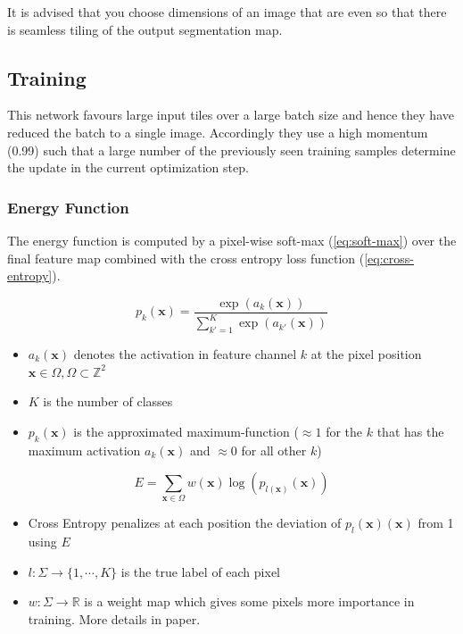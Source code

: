\documentclass[11pt]{article}
\begin{document}
It is advised that you choose dimensions of an image that are even so that there is seamless tiling of the output segmentation map.

\subsection{Training}

This network favours large input tiles over a large batch size and hence they have reduced the batch to a single image. Accordingly they use a high momentum (0.99) such that a large number of the previously seen training samples determine the update in the current optimization step.

\subsubsection{Energy Function}

The energy function is computed by a pixel-wise soft-max (\ref{eq:soft-max}) over the final feature map combined with the cross entropy loss function (\ref{eq:cross-entropy}). 

\begin{equation}
    p_k(\textbf{x}) = \frac{\exp(a_k(\textbf{x}))}{\sum^K_{k'=1}\exp(a_{k'}(\textbf{x}))}\label{eq:soft-max}
\end{equation}

\begin{itemize}
    \item $a_k(\textbf{x})$ denotes the activation in feature channel $k$ at the pixel position $\textbf{x} \in \Omega, \Omega \subset \mathbb{Z}^2$
    \item $K$ is the number of classes
    \item $p_k(\textbf{x})$ is the approximated maximum-function ($\approx 1$ for the $k$ that has the maximum activation $a_k(\textbf{x})$ and $\approx 0$ for all other $k$)
\end{itemize}

\begin{equation}
    E = \sum_{\textbf{x} \in \Omega} w(\textbf{x})\log(p_{l(\textbf{x})}(\textbf{x}))\label{eq:cross-entropy}
\end{equation}

\begin{itemize}
    \item Cross Entropy penalizes at each position the deviation of $p_l(\textbf{x})(\textbf{x})$ from 1 using $E$
    \item $l : \Sigma \rightarrow \{1, \cdots, K \}$ is the true label of each pixel
    \item $w : \Sigma \rightarrow \mathbb R$ is a weight map which gives some pixels more importance in training. More details in paper.
\end{itemize}
\end{document}
